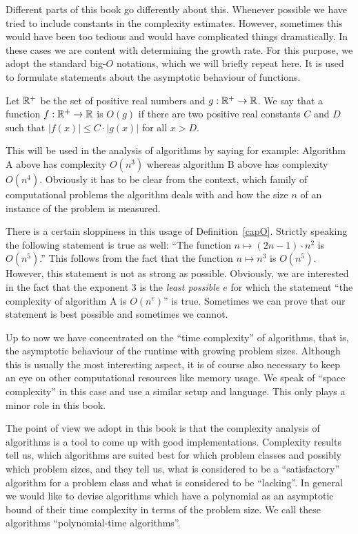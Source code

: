 Different parts of this book go differently about this. Whenever
possible we have tried to include constants in the complexity
estimates. However, sometimes this would have been too tedious and
would have complicated things dramatically. In these cases we are
content with determining the growth rate. For this purpose, we adopt
%
the standard big-$O$ notations, which we will briefly repeat here.
It is used to formulate statements about the asymptotic behaviour of
functions.

\begin{Def}
    \label{capO}%
    Let $\mathbb{R}^+$ be the set of positive real numbers and
    $g : \mathbb{R}^+ \to \mathbb{R}$.
    We say that a function $f : \mathbb{R}^+ \to \mathbb{R}$ is $O(g)$ if there are
    two positive real constants $C$ and $D$ such that 
    $|f(x)| \le C \cdot |g(x)|$ for all $x > D$.
\end{Def}

This will be used in the analysis of algorithms by saying for
example: Algorithm A above has complexity $O(n^3)$ whereas algorithm B
%
above has complexity $O(n^4)$. Obviously it has to be clear from the
context, which family of computational problems the algorithm deals
with and how the size $n$ of an instance of the problem is measured.

There is a certain sloppiness in this usage of Definition~\ref{capO}.
Strictly speaking the following statement is true as well: 
``The function $n \mapsto (2n-1)\cdot n^2$ is $O(n^5)$.'' This follows
from the fact that the function $n \mapsto n^3$ is $O(n^5)$. However,
this statement is not as strong as possible. Obviously, we are
interested in the fact that the exponent $3$ is the \emph{least
possible $e$} for which the statement ``the complexity of algorithm A is
$O(n^e)$'' is true. Sometimes we can prove that our statement is best
possible and sometimes we cannot.

Up to now we have concentrated on the ``time complexity'' of
%
algorithms, that is, the asymptotic behaviour of the runtime with
growing problem sizes. Although this is usually the most interesting
aspect, it is of course also necessary to keep an eye on other
computational resources like memory usage. We speak of ``space
complexity'' in this case and use a similar setup and language. This
%
only plays a minor role in this book.

The point of view we adopt in this book is that the complexity analysis of
algorithms is a tool to come up with good implementations. Complexity
results tell us, which algorithms are suited best for which problem
classes and possibly which problem sizes, and they tell us, what is
considered to be a ``satisfactory'' algorithm for a problem class and
what is considered to be ``lacking''. In general we would like to
devise algorithms which have a polynomial as an asymptotic bound of their
time complexity in terms of the problem size. We call these algorithms
``polynomial-time algorithms''.


